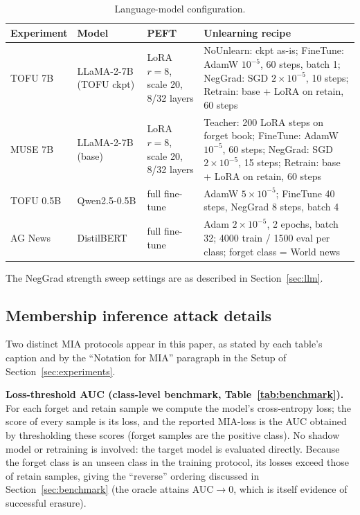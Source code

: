 \documentclass[smallextended]{svjour3}       %
\begin{document}
\begin{table}[t]
\centering
\footnotesize
\caption{Language-model configuration.}
\label{tab:exp_llm}
\setlength{\tabcolsep}{2pt}
\begin{tabular}{@{}p{1.4cm} p{3.0cm} p{2.8cm} p{4.4cm}@{}}
\toprule
Experiment & Model & PEFT & Unlearning recipe \\
\midrule
TOFU 7B & LLaMA-2-7B (TOFU ckpt) & LoRA $r{=}8$, scale 20, 8/32 layers & NoUnlearn: ckpt as-is; FineTune: AdamW $10^{-5}$, 60 steps, batch 1; NegGrad: SGD $2{\times}10^{-5}$, 10 steps; Retrain: base + LoRA on retain, 60 steps \\
MUSE 7B & LLaMA-2-7B (base) & LoRA $r{=}8$, scale 20, 8/32 layers & Teacher: 200 LoRA steps on forget book; FineTune: AdamW $10^{-5}$, 60 steps; NegGrad: SGD $2{\times}10^{-5}$, 15 steps; Retrain: base + LoRA on retain, 60 steps \\
TOFU 0.5B & Qwen2.5-0.5B & full fine-tune & AdamW $5{\times}10^{-5}$; FineTune 40 steps, NegGrad 8 steps, batch 4 \\
AG News & DistilBERT & full fine-tune & Adam $2{\times}10^{-5}$, 2 epochs, batch 32; 4000 train / 1500 eval per class; forget class = World news \\
\bottomrule
\end{tabular}
\end{table}

The NegGrad strength sweep settings are as described in Section~\ref{sec:llm}.

\subsection{Membership inference attack details}
\label{app:mia}

Two distinct MIA protocols appear in this paper, as stated by each table's caption and by the ``Notation for MIA'' paragraph in the Setup of Section~\ref{sec:experiments}.

\textbf{Loss-threshold AUC (class-level benchmark, Table~\ref{tab:benchmark}).} For each forget and retain sample we compute the model's cross-entropy loss; the score of every sample is its loss, and the reported MIA-loss is the AUC obtained by thresholding these scores (forget samples are the positive class). No shadow model or retraining is involved: the target model is evaluated directly. Because the forget class is an unseen class in the training protocol, its losses exceed those of retain samples, giving the ``reverse'' ordering discussed in Section~\ref{sec:benchmark} (the oracle attains AUC${\to}0$, which is itself evidence of successful erasure).
\end{document}
